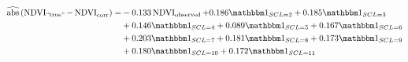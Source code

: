 \begin{equation}\label{eq:corr_lm_res}
	\begin{aligned}		
		\widehat{\operatorname{abs}}\left({\operatorname{NDVI}_\text{``true''} - \operatorname{NDVI}}_{\text{corr}}\right)  = &
		-0.133 \operatorname{NDVI}_\text{observed}  + 0.186 \mathbbm 1_{{SCL = 2}} + 0.185 \mathbbm 1_{{SCL = 3}} \\ &
		+ 0.146 \mathbbm 1_{{SCL = 4}} 
		+ 0.089 \mathbbm 1_{{SCL = 5}} 
		+ 0.167 \mathbbm 1_{{SCL = 6}} \\ &
		+ 0.203 \mathbbm 1_{{SCL = 7}} 
		+ 0.181 \mathbbm 1_{{SCL = 8}}  
		+ 0.173 \mathbbm 1_{{SCL = 9}} \\ &
		+ 0.180 \mathbbm 1_{{SCL = 10}} 
		+ 0.172 \mathbbm 1_{{SCL = 11}} 
	\end{aligned}
\end{equation}
